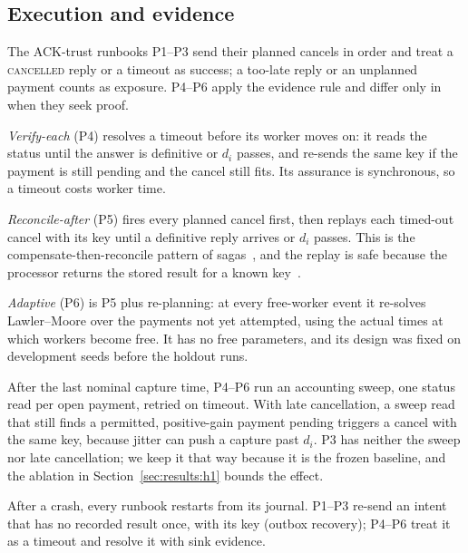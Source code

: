 \subsection{Execution and evidence}
The ACK-trust runbooks P1--P3 send their planned cancels in order and treat a \textsc{cancelled} reply or a timeout as success; a too-late reply or an unplanned payment counts as exposure. P4--P6 apply the evidence rule and differ only in when they seek proof.

\emph{Verify-each} (P4) resolves a timeout before its worker moves on: it reads the status until the answer is definitive or $d_i$ passes, and re-sends the same key if the payment is still pending and the cancel still fits. Its assurance is synchronous, so a timeout costs worker time.

\emph{Reconcile-after} (P5) fires every planned cancel first, then replays each timed-out cancel with its key until a definitive reply arrives or $d_i$ passes. This is the compensate-then-reconcile pattern of sagas~\cite{garciamolina1987sagas}, and the replay is safe because the processor returns the stored result for a known key~\cite{stripe2026idempotency}.

\emph{Adaptive} (P6) is P5 plus re-planning: at every free-worker event it re-solves Lawler--Moore over the payments not yet attempted, using the actual times at which workers become free. It has no free parameters, and its design was fixed on development seeds before the holdout runs.

After the last nominal capture time, P4--P6 run an accounting sweep, one status read per open payment, retried on timeout. With late cancellation, a sweep read that still finds a permitted, positive-gain payment pending triggers a cancel with the same key, because jitter can push a capture past $d_i$. P3 has neither the sweep nor late cancellation; we keep it that way because it is the frozen baseline, and the ablation in Section~\ref{sec:results:h1} bounds the effect.

After a crash, every runbook restarts from its journal. P1--P3 re-send an intent that has no recorded result once, with its key (outbox recovery); P4--P6 treat it as a timeout and resolve it with sink evidence.
